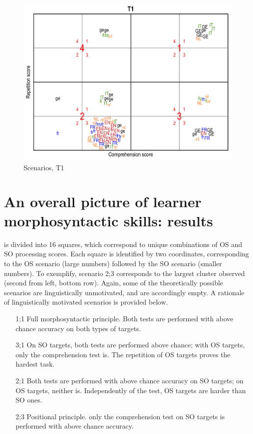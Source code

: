 \begin{figure}
    \includegraphics[width=\textwidth]{figures/06-5.pdf}
    \caption{Scenarios, T1}
    \label{fig:06:5}
\end{figure}

\section{An overall picture of learner morphosyntactic skills: results}\label{sec:06:3}

 is divided into 16 squares, which correspond to unique combinations of OS and SO processing scores. Each square is identified by two coordinates, corresponding to the OS scenario (large numbers) followed by the SO scenario (smaller numbers). To exemplify, scenario 2;3 corresponds to the largest cluster observed (second from left, bottom row). Again, some of the theoretically possible scenarios are linguistically unmotivated, and are accordingly empty. A rationale of linguistically motivated scenarios is provided below.

\begin{itemize}
    \item[1;1] Full morphosyntactic principle. Both tests are performed with above chance accuracy on both types of targets.
    \item [3;1] On SO targets, both tests are performed above chance; with OS targets, only the comprehension test is. The repetition of OS targets proves the hardest task.
    \item[2;1] Both tests are performed with above chance accuracy on SO targets; on OS targets, neither is. Independently of the test, OS targets are harder than SO ones.
    \item[2;3] Positional principle. only the comprehension test on SO targets is performed with above chance accuracy. 
\end{itemize}

